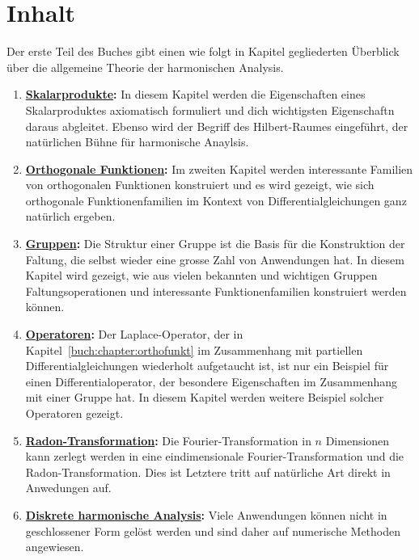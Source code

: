 %
%
%
\section{Inhalt
\label{buch:einleitung:section:inhalt}}
Der erste Teil des Buches gibt einen wie folgt in Kapitel gegliederten
Überblick über die allgemeine Theorie der harmonischen Analysis.

\begin{enumerate}
\item {\bf \hyperref[buch:chapter:skalarprodukte]{Skalarprodukte}:}
In diesem Kapitel werden die Eigenschaften eines Skalarproduktes 
axiomatisch formuliert und dich wichtigsten Eigenschaftn daraus
abgleitet.
Ebenso wird der Begriff des Hilbert-Raumes eingeführt, der natürlichen
Bühne für harmonische Anaylsis.
\item {\bf \hyperref[buch:chapter:orthofunkt]{Orthogonale Funktionen}:}
Im zweiten Kapitel werden interessante Familien von orthogonalen
Funktionen konstruiert und es wird gezeigt, wie sich orthogonale
Funktionenfamilien im Kontext von Differentialgleichungen ganz natürlich
ergeben.
\item {\bf \hyperref[buch:chapter:gruppen]{Gruppen}:}
Die Struktur einer Gruppe ist die Basis für die Konstruktion der Faltung,
die selbst wieder eine grosse Zahl von Anwendungen hat.
In diesem Kapitel wird gezeigt, wie aus vielen bekannten und wichtigen
Gruppen Faltungsoperationen und interessante Funktionenfamilien
konstruiert werden können.
\item {\bf \hyperref[buch:chapter:operatoren]{Operatoren}:}
Der Laplace-Operator, der in Kapitel~\ref{buch:chapter:orthofunkt}
im Zusammenhang mit partiellen Differentialgleichungen wiederholt
aufgetaucht ist, ist nur ein Beispiel für einen Differentialoperator,
der besondere Eigenschaften im Zusammenhang mit einer Gruppe hat.
In diesem Kapitel werden weitere Beispiel solcher Operatoren gezeigt.
\item {\bf \hyperref[buch:chapter:radon]{Radon-Transformation}:}
Die Fourier-Transformation in $n$ Dimensionen kann zerlegt werden in
eine eindimensionale Fourier-Transformation und die Radon-Transformation.
Dies ist 
Letztere tritt auf natürliche Art direkt in Anwedungen auf.
\item {\bf \hyperref[buch:chapter:diskret]{Diskrete harmonische Analysis}:}
Viele Anwendungen können nicht in geschlossener Form gelöst werden
und sind daher auf numerische Methoden angewiesen.

\end{enumerate}
